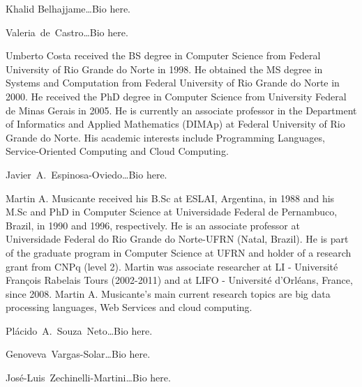 \documentclass{singlecol-new}
\theoremstyle{TH}{
\newtheorem{lemma}{Lemma}
\newtheorem{theorem}[lemma]{Theorem}
\newtheorem{corrolary}[lemma]{Corrolary}
\newtheorem{conjecture}[lemma]{Conjecture}
\newtheorem{proposition}[lemma]{Proposition}
\newtheorem{claim}[lemma]{Claim}
\newtheorem{stheorem}[lemma]{Wrong Theorem}
\newtheorem{algorithm}{Algorithm}
}
\theoremstyle{THrm}{
\newtheorem{definition}{Definition}[section]
\newtheorem{question}{Question}[section]
\newtheorem{remark}{Remark}
\newtheorem{scheme}{Scheme}
}
\theoremstyle{THhit}{
\newtheorem{case}{Case}[section]
}
\theoremstyle{THhsl}{
\newtheorem{example}{Example}
}
\newcommand{\pisodm}[0]{$\pi$SOD-M\xspace}
\begin{document}
\begin{abstract}
Specifying non-functional requirements (NFRs) is a complex task, being usually dealt with on the later phases of the software process.
The late inclusion of NFRs in the development may compromise the quality of the deployed application.
This paper presents \pisodm, a method and associated tools that
\textit{(i)}  allows the early specification of NFRs in a principled way: users are abstracted away from low level details;
\textit{(ii)} embraces the MDA philosophy, generating models (code) whenever possible.
Our solution has been used in the context of an industrial and real case study.
\end{abstract}



\begin{bio}
Khalid Belhajjame\dots Bio here.

\noindent Valeria~de~Castro\dots Bio here.

\noindent Umberto Costa received the BS degree in Computer Science from Federal University of Rio Grande do Norte in 1998. 
He obtained the MS degree in Systems and Computation from Federal University of Rio Grande do Norte in 2000. 
He received the PhD degree in Computer Science from University Federal de Minas Gerais in 2005. He is currently an associate professor in the Department of 
Informatics and Applied Mathematics (DIMAp) at Federal University of Rio Grande do Norte. His academic interests include Programming Languages, 
Service-Oriented Computing and Cloud Computing.

\noindent Javier~A.~Espinosa-Oviedo\dots Bio here.

\noindent Martin A. Musicante received his B.Sc at ESLAI, Argentina, in 1988 and
his M.Sc and PhD in Computer Science at Universidade Federal de
Pernambuco, Brazil, in 1990 and 1996, respectively. He is an associate
professor at Universidade Federal do Rio Grande do Norte-UFRN (Natal,
Brazil). He is part of the graduate program in Computer Science at
UFRN and holder of a research grant from CNPq (level 2). Martin was
associate researcher at LI - Universit\'e Fran\c{c}ois Rabelais Tours
(2002-2011) and at LIFO - Universit\'e d'Orl\'eans, France, since 2008.
Martin A. Musicante's main current research topics are big data
processing languages, Web Services and cloud computing.

\noindent Pl\'acido~A.~Souza~Neto\dots Bio here.

\noindent Genoveva~Vargas-Solar\dots Bio here.

\noindent Jos\'e-Luis~Zechinelli-Martini\dots Bio here.
\end{bio}
\end{document}
